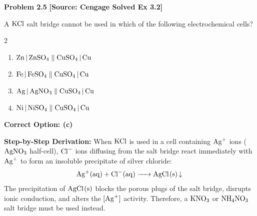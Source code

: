 \begin{problembox}
\textbf{Problem 2.5} \hfill \textbf{[Source: Cengage Solved Ex 3.2]}

A $\ce{KCl}$ salt bridge cannot be used in which of the following electrochemical cells?
\begin{multicols}{2}
\begin{enumerate}[label=(\alph*)]
    \item $\ce{Zn | ZnSO4} \parallel \ce{CuSO4 | Cu}$
    \item $\ce{Fe | FeSO4} \parallel \ce{CuSO4 | Cu}$
    \item $\ce{Ag | AgNO3} \parallel \ce{CuSO4 | Cu}$
    \item $\ce{Ni | NiSO4} \parallel \ce{CuSO4 | Cu}$
\end{enumerate}
\end{multicols}
\end{problembox}
\begin{solution}
\textbf{Correct Option: (c)}

\textbf{Step-by-Step Derivation:}
When $\ce{KCl}$ is used in a cell containing $\ce{Ag+}$ ions ($\ce{AgNO3}$ half-cell), $\ce{Cl-}$ ions diffusing from the salt bridge react immediately with $\ce{Ag+}$ to form an insoluble precipitate of silver chloride:
\begin{equation*}
    \ce{Ag+(aq) + Cl^-(aq) -> AgCl(s) v}
\end{equation*}
The precipitation of $\ce{AgCl(s)}$ blocks the porous plugs of the salt bridge, disrupts ionic conduction, and alters the $[\ce{Ag+}]$ activity. Therefore, a $\ce{KNO3}$ or $\ce{NH4NO3}$ salt bridge must be used instead.
\end{solution}

